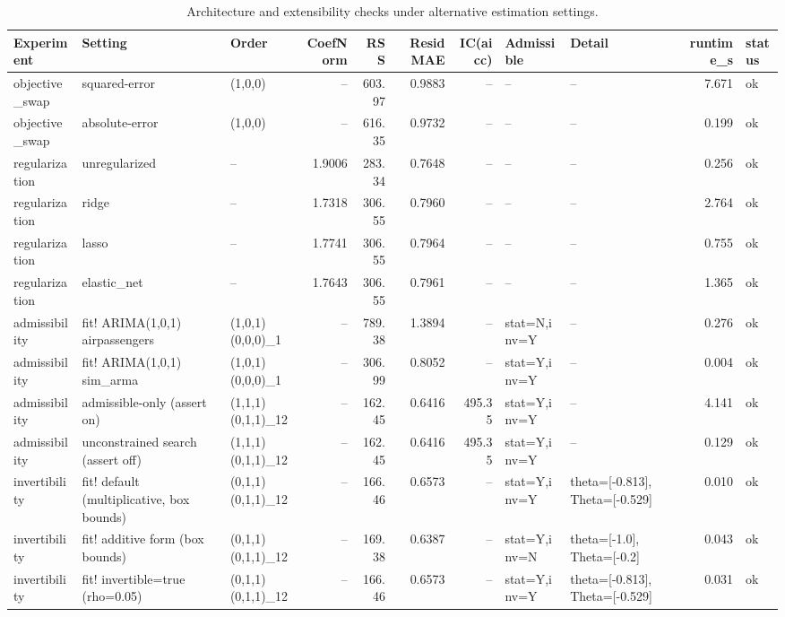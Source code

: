 \begin{table}[t]
\centering
\caption{Architecture and extensibility checks under alternative estimation settings.}
\label{tab:architecture_extensibility}
\begin{tabular}{lllrrrrllrl}
\hline
Experiment & Setting & Order & CoefNorm & RSS & ResidMAE & IC(aicc) & Admissible & Detail & runtime\_s & status \\
\hline
objective\_swap & squared-error & (1,0,0) & -- & 603.97 & 0.9883 & -- & -- & -- & 7.671 & ok \\
objective\_swap & absolute-error & (1,0,0) & -- & 616.35 & 0.9732 & -- & -- & -- & 0.199 & ok \\
regularization & unregularized & -- & 1.9006 & 283.34 & 0.7648 & -- & -- & -- & 0.256 & ok \\
regularization & ridge & -- & 1.7318 & 306.55 & 0.7960 & -- & -- & -- & 2.764 & ok \\
regularization & lasso & -- & 1.7741 & 306.55 & 0.7964 & -- & -- & -- & 0.755 & ok \\
regularization & elastic\_net & -- & 1.7643 & 306.55 & 0.7961 & -- & -- & -- & 1.365 & ok \\
admissibility & fit! ARIMA(1,0,1) airpassengers & (1,0,1)(0,0,0)\_1 & -- & 789.38 & 1.3894 & -- & stat=N,inv=Y & -- & 0.276 & ok \\
admissibility & fit! ARIMA(1,0,1) sim\_arma & (1,0,1)(0,0,0)\_1 & -- & 306.99 & 0.8052 & -- & stat=Y,inv=Y & -- & 0.004 & ok \\
admissibility & admissible-only (assert on) & (1,1,1)(0,1,1)\_12 & -- & 162.45 & 0.6416 & 495.35 & stat=Y,inv=Y & -- & 4.141 & ok \\
admissibility & unconstrained search (assert off) & (1,1,1)(0,1,1)\_12 & -- & 162.45 & 0.6416 & 495.35 & stat=Y,inv=Y & -- & 0.129 & ok \\
invertibility & fit! default (multiplicative, box bounds) & (0,1,1)(0,1,1)\_12 & -- & 166.46 & 0.6573 & -- & stat=Y,inv=Y & theta=[-0.813], Theta=[-0.529] & 0.010 & ok \\
invertibility & fit! additive form (box bounds) & (0,1,1)(0,1,1)\_12 & -- & 169.38 & 0.6387 & -- & stat=Y,inv=N & theta=[-1.0], Theta=[-0.2] & 0.043 & ok \\
invertibility & fit! invertible=true (rho=0.05) & (0,1,1)(0,1,1)\_12 & -- & 166.46 & 0.6573 & -- & stat=Y,inv=Y & theta=[-0.813], Theta=[-0.529] & 0.031 & ok \\
\hline
\end{tabular}
\end{table}